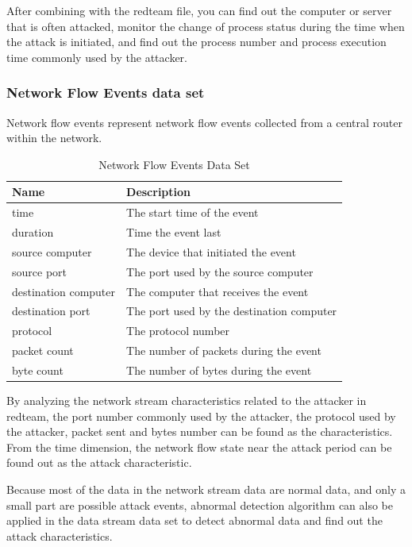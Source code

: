 \documentclass[12pt,journal,draftcls,doublespace, letterpaper,onecolumn]{IEEEtran}
\begin{document}
After combining with the redteam file, you can find out the computer or server that is often attacked, monitor the change of process status during the time when the attack is initiated, and find out the process number and process execution time commonly used by the attacker. 

\subsubsection{Network Flow Events data set}

Network flow events represent network flow events collected from a central router within the network.

\begin{table}[h]
	\caption{Network Flow Events Data Set}
	\vspace{1pt}
	\centering
	\begin{tabular}{p{2.5cm}p{5cm}}
		\hline
		Name & Description \\
		\hline
		time  & The start time of the event\\
		duration  & Time the event last\\  
		source computer  & The device that initiated the event\\
		source port  & The port used by the source computer\\
		destination computer  & The computer that receives the event\\
		destination port  & The port used by the destination computer\\
		protocol  & The protocol number\\ 
		packet count  & The number of packets during the event\\
		byte count  & The number of bytes during the event\\ 
		\hline       
	\end{tabular}
	\label{bs2}
\end{table}

By analyzing the network stream characteristics related to the attacker in redteam, the port number commonly used by the attacker, the protocol used by the attacker, packet sent and bytes number can be found as the characteristics. From the time dimension, the network flow state near the attack period can be found out as the attack characteristic.

Because most of the data in the network stream data are normal data, and only a small part are possible attack events, abnormal detection algorithm can also be applied in the data stream data set to detect abnormal data and find out the attack characteristics.
\end{document}
